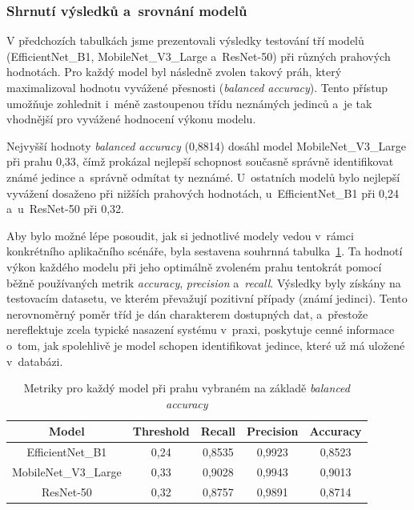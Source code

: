 \subsubsection*{Shrnutí výsledků a~srovnání modelů}
V předchozích tabulkách jsme prezentovali výsledky testování tří modelů (EfficientNet\_B1, MobileNet\_V3\_Large a~ResNet-50) při různých prahových hodnotách. Pro každý model byl následně zvolen takový práh, který maximalizoval hodnotu vyvážené přesnosti (\textit{balanced accuracy}). Tento přístup umožňuje zohlednit i~méně zastoupenou třídu neznámých jedinců a~je tak vhodnější pro vyvážené hodnocení výkonu modelu.

Nejvyšší hodnoty \textit{balanced accuracy} (0,8814) dosáhl model MobileNet\_V3\_Large při prahu 0,33, čímž prokázal nejlepší schopnost současně správně identifikovat známé jedince a~správně odmítat ty neznámé. U~ostatních modelů bylo nejlepší vyvážení dosaženo při nižších prahových hodnotách, u~EfficientNet\_B1 při 0,24 a~u~ResNet-50 při 0,32.

Aby bylo možné lépe posoudit, jak si jednotlivé modely vedou v~rámci konkrétního aplikačního scénáře, byla sestavena souhrnná tabulka~\ref{metricsComparison}. Ta hodnotí výkon každého modelu při jeho optimálně zvoleném prahu tentokrát pomocí běžně používaných metrik \textit{accuracy}, \textit{precision} a~\textit{recall}. Výsledky byly získány na testovacím datasetu, ve kterém převažují pozitivní případy (známí jedinci). Tento nerovnoměrný poměr tříd je dán charakterem dostupných dat, a~přestože nereflektuje zcela typické nasazení systému v~praxi, poskytuje cenné informace o~tom, jak spolehlivě je model schopen identifikovat jedince, které už má uložené v~databázi.

\begin{table}[hbt]
	\centering
	\begin{tabular}{|c|c|c|c|c|}
		\hline
		\textbf{Model} & \textbf{Threshold} & \textbf{Recall} & \textbf{Precision} & \textbf{Accuracy} \\ \hline
		EfficientNet\_B1 & 0,24 & 0,8535 & 0,9923 & 0,8523 \\ \hline
		MobileNet\_V3\_Large & 0,33 & 0,9028 & 0,9943 & 0,9013 \\ \hline
		ResNet-50 & 0,32 & 0,8757 & 0,9891 & 0,8714 \\ \hline
	\end{tabular}
	\caption{Metriky pro každý model při prahu vybraném na základě \textit{balanced accuracy}}
	\label{metricsComparison}
\end{table}

